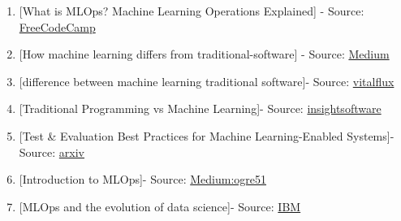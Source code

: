 \documentclass[
  letterpaper,
  DIV=11,
  numbers=noendperiod]{scrartcl}
\providecommand{\tightlist}{%
  \setlength{\itemsep}{0pt}\setlength{\parskip}{0pt}}\usepackage{longtable,booktabs,array}
\begin{document}
\begin{enumerate}
\def\labelenumi{\arabic{enumi}.}
\tightlist
\item
  {[}What is MLOps? Machine Learning Operations Explained{]} - Source:
  \href{https://www.freecodecamp.org/news/what-is-mlops-machine-learning-operations-explained/}{FreeCodeCamp}
\item
  {[}How machine learning differs from traditional-software{]} - Source:
  \href{https://medium.com/machine-learning-in-practice/how-machine-learning-differs-from-traditional-software-80d0a235ff3b}{Medium}
\item
  {[}difference between machine learning traditional software{]}-
  Source:
  \href{https://vitalflux.com/difference-between-machine-learning-traditional-software/}{vitalflux}
\item
  {[}Traditional Programming vs Machine Learning{]}- Source:
  \href{https://insightsoftware.com/blog/machine-learning-vs-traditional-programming/}{insightsoftware}
\item
  {[}Test \& Evaluation Best Practices for Machine Learning-Enabled
  Systems{]}- Source: \href{https://arxiv.org/pdf/2310.06800}{arxiv}
\item
  {[}Introduction to MLOps{]}- Source:
  \href{https://readmedium.com/en/https:/ogre51.medium.com/introduction-to-mlops-815d03c8a4d4}{Medium:ogre51}
\item
  {[}MLOps and the evolution of data science{]}- Source:
  \href{https://www.ibm.com/blog/mlops-and-the-evolution-of-data-science/}{IBM}
\end{enumerate}
\end{document}
